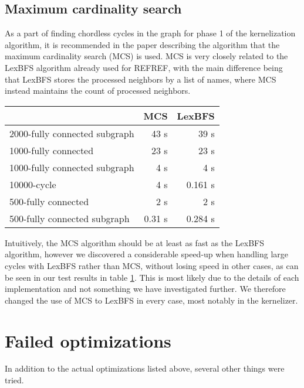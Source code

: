 \documentclass{article}
\begin{document}
		\subsection{Maximum cardinality search}
		\label{subsec:maximum-cardinality-search}
		As a part of finding chordless cycles in the graph for phase 1 of the kernelization algorithm, it is recommended in the paper describing the algorithm\cite{kernel} that the maximum cardinality search (MCS) is used.
		MCS is very closely related to the LexBFS algorithm already used for REFREF, with the main difference being that LexBFS stores the processed neighbors by a list of names, where MCS instead maintains the count of processed neighbors.

		\begin{table}[!ht]
			\begin{tabular}{| l | r | r |}
			\hline
											& MCS 		& LexBFS 	\\ \hline
			2000-fully connected subgraph	& 43 s  	& 39 s 		\\ \hline
			1000-fully connected 			& 23 s 		& 23 s 		\\ \hline
			1000-fully connected subgraph	& 4 s   	& 4 s 		\\ \hline
			10000-cycle 					& 4 s   	& 0.161 s 	\\ \hline 
			500-fully connected 			& 2 s   	& 2 s 		\\ \hline 
			500-fully connected subgraph 	& 0.31 s 	& 0.284 s 	\\ \hline 
			\end{tabular}
			\label{table:maximum-cardinality-search}
		\end{table}
		Intuitively, the MCS algorithm should be at least as fast as the LexBFS algorithm, however we discovered a considerable speed-up when handling large cycles with LexBFS rather than MCS, without losing speed in other cases, as can be seen in our test results in table \ref{table:maximum-cardinality-search}.
		This is most likely due to the details of each implementation and not something we have investigated further.
		We therefore changed the use of MCS to LexBFS in every case, most notably in the kernelizer.

	\section{Failed optimizations}
	In addition to the actual optimizations listed above, several other things were tried.
\end{document}
